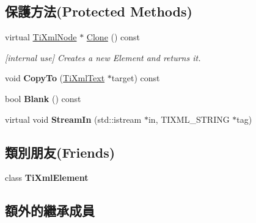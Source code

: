 \subsection*{保護方法(Protected Methods)}
\begin{DoxyCompactItemize}
\item 
virtual \hyperlink{class_ti_xml_node}{Ti\+Xml\+Node} $\ast$ \hyperlink{class_ti_xml_text_adde1869dfb029be50713fbfd8ce4d21f}{Clone} () const \hypertarget{class_ti_xml_text_adde1869dfb029be50713fbfd8ce4d21f}{}\label{class_ti_xml_text_adde1869dfb029be50713fbfd8ce4d21f}

\begin{DoxyCompactList}\small\item\em \mbox{[}internal use\mbox{]} Creates a new Element and returns it. \end{DoxyCompactList}\item 
void {\bfseries Copy\+To} (\hyperlink{class_ti_xml_text}{Ti\+Xml\+Text} $\ast$target) const \hypertarget{class_ti_xml_text_adcec7d9b6fccfc5777452bb97e6031c1}{}\label{class_ti_xml_text_adcec7d9b6fccfc5777452bb97e6031c1}

\item 
bool {\bfseries Blank} () const \hypertarget{class_ti_xml_text_a1c120428e3b3cf24d79706e6d2b65aa6}{}\label{class_ti_xml_text_a1c120428e3b3cf24d79706e6d2b65aa6}

\item 
virtual void {\bfseries Stream\+In} (std\+::istream $\ast$in, T\+I\+X\+M\+L\+\_\+\+S\+T\+R\+I\+NG $\ast$tag)\hypertarget{class_ti_xml_text_a261e07cdbd5363f994371320414c17d9}{}\label{class_ti_xml_text_a261e07cdbd5363f994371320414c17d9}

\end{DoxyCompactItemize}
\subsection*{類別朋友(Friends)}
\begin{DoxyCompactItemize}
\item 
class {\bfseries Ti\+Xml\+Element}\hypertarget{class_ti_xml_text_ab6592e32cb9132be517cc12a70564c4b}{}\label{class_ti_xml_text_ab6592e32cb9132be517cc12a70564c4b}

\end{DoxyCompactItemize}
\subsection*{額外的繼承成員}


